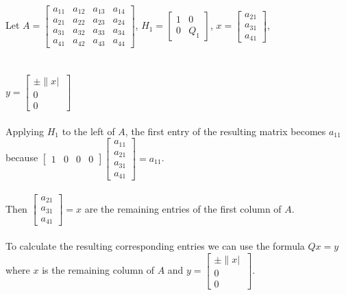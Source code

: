 \documentclass[12pt]{article}
\begin{document}
\begin{enumerate}[label=(\alph*)]
        Let $A = \begin{bmatrix} a_{11} & a_{12} & a_{13} & a_{14} \\ a_{21} & a_{22} & a_{23} & a_{24} \\ a_{31} & a_{32} & a_{33} & a_{34} \\ a_{41} & a_{42} & a_{43} & a_{44} \end{bmatrix}$, \quad
        $H_1 = \begin{bmatrix} 1 & 0 \\ 0 & Q_1 \end{bmatrix}$, \quad $x = \begin{bmatrix} a_{21} \\ a_{31} \\ a_{41} \end{bmatrix}$, \\ \\ \\
        $y = \begin{bmatrix} \pm \|x|\ \\ 0 \\ 0 \end{bmatrix}$ \\ \\
        Applying $H_1$ to the left of $A$, the first entry of the resulting matrix becomes $a_{11}$ because
        $\begin{bmatrix} 1 & 0 & 0 & 0 \end{bmatrix} \begin{bmatrix} a_{11} \\ a_{21} \\ a_{31} \\ a_{41} \end{bmatrix} = a_{11}$. \\ \\
        Then $\begin{bmatrix} a_{21} \\ a_{31} \\ a_{41} \end{bmatrix} = x$ are the remaining entries of the first column of $A$. \\ \\
        To calculate the resulting corresponding entries we can use the formula $Qx = y$ where $x$ is the remaining column of $A$ and 
        $y= \begin{bmatrix} \pm \|x|\ \\ 0 \\ 0 \end{bmatrix}$.\\ \\ 

\end{enumerate}
\end{document}

